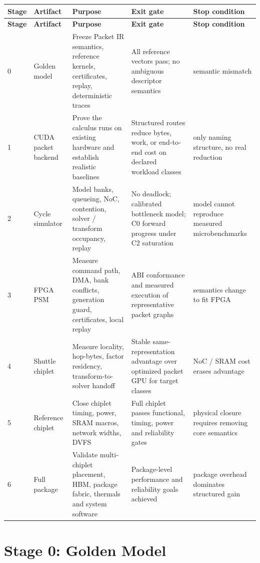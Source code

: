 \documentclass[10pt,letterpaper]{article}
\begin{document}
{{\footnotesize\begin{longtable}{p{0.32in}p{0.92in}p{1.50in}p{1.88in}p{1.23in}}
\toprule
\textbf{Stage} & \textbf{Artifact} & \textbf{Purpose} & \textbf{Exit gate} & \textbf{Stop condition}\\
\midrule
\endfirsthead
\toprule
\textbf{Stage} & \textbf{Artifact} & \textbf{Purpose} & \textbf{Exit gate} & \textbf{Stop condition}\\
\midrule
\endhead
0 & Golden model & Freeze Packet IR semantics, reference kernels, certificates, replay, deterministic traces & All reference vectors pass; no ambiguous descriptor semantics & semantic mismatch\\
1 & CUDA packet backend & Prove the calculus runs on existing hardware and establish realistic baselines & Structured routes reduce bytes, work, or end-to-end cost on declared workload classes & only naming structure, no real reduction\\
2 & Cycle simulator & Model banks, queueing, NoC, contention, solver / transform occupancy, replay & No deadlock; calibrated bottleneck model; C0 forward progress under C2 saturation & model cannot reproduce measured microbenchmarks\\
3 & FPGA PSM & Measure command path, DMA, bank conflicts, generation guard, certificates, local replay & ABI conformance and measured execution of representative packet graphs & semantics change to fit FPGA\\
4 & Shuttle chiplet & Measure locality, hop-bytes, factor residency, transform-to-solver handoff & Stable same-representation advantage over optimized packet GPU for target classes & NoC / SRAM cost erases advantage\\
5 & Reference chiplet & Close chiplet timing, power, SRAM macros, network widths, DVFS & Full chiplet passes functional, timing, power and reliability gates & physical closure requires removing core semantics\\
6 & Full package & Validate multi-chiplet placement, HBM, package fabric, thermals and system software & Package-level performance and reliability goals achieved & package overhead dominates structured gain\\
\bottomrule
\end{longtable}

\section{Stage 0: Golden Model}

}}
\end{document}
